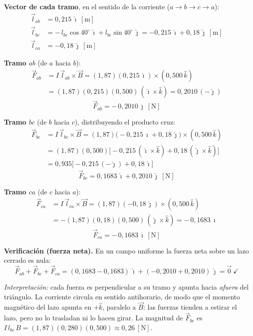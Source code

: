 \documentclass[12pt,letterpaper]{article}
\begin{document}
\bigskip

\noindent\textbf{Vector de cada tramo}, en el sentido de la corriente ($a\to b\to c\to a$):
\begin{align*}
    \vec{l}_{ab} &= 0{,}215\,\hat{\imath}\ [\text{m}]\\[2pt]
    \vec{l}_{bc} &= -\,l_{bc}\cos40^\circ\,\hat{\imath} + l_{bc}\sin40^\circ\,\hat{\jmath}
                  = -0{,}215\,\hat{\imath} + 0{,}18\,\hat{\jmath}\ [\text{m}]\\[2pt]
    \vec{l}_{ca} &= -0{,}18\,\hat{\jmath}\ [\text{m}]
\end{align*}

\noindent\textbf{Tramo $ab$} (de $a$ hacia $b$):
\begin{align*}
    \vec{F}_{ab} &= I\,\vec{l}_{ab}\times\vec{B} = (1{,}87)(0{,}215\,\hat{\imath})\times(0{,}500\,\hat{k})\\[2pt]
                 &= (1{,}87)(0{,}215)(0{,}500)\,(\hat{\imath}\times\hat{k}) = 0{,}2010\,(-\hat{\jmath})
\end{align*}
\[
    \boxed{\vec{F}_{ab} = -\,0{,}2010\,\hat{\jmath}\ [\text{N}]}
\]

\noindent\textbf{Tramo $bc$} (de $b$ hacia $c$), distribuyendo el producto cruz:
\begin{align*}
    \vec{F}_{bc} &= I\,\vec{l}_{bc}\times\vec{B}
                  = (1{,}87)\bigl(-0{,}215\,\hat{\imath} + 0{,}18\,\hat{\jmath}\bigr)\times(0{,}500\,\hat{k})\\[2pt]
                 &= (1{,}87)(0{,}500)\bigl[-0{,}215\,(\hat{\imath}\times\hat{k}) + 0{,}18\,(\hat{\jmath}\times\hat{k})\bigr]\\[2pt]
                 &= 0{,}935\bigl[-0{,}215\,(-\hat{\jmath}) + 0{,}18\,\hat{\imath}\bigr]
\end{align*}
\[
    \boxed{\vec{F}_{bc} = 0{,}1683\,\hat{\imath} + 0{,}2010\,\hat{\jmath}\ [\text{N}]}
\]

\noindent\textbf{Tramo $ca$} (de $c$ hacia $a$):
\begin{align*}
    \vec{F}_{ca} &= I\,\vec{l}_{ca}\times\vec{B} = (1{,}87)(-0{,}18\,\hat{\jmath})\times(0{,}500\,\hat{k})\\[2pt]
                 &= -(1{,}87)(0{,}18)(0{,}500)\,(\hat{\jmath}\times\hat{k}) = -\,0{,}1683\,\hat{\imath}
\end{align*}
\[
    \boxed{\vec{F}_{ca} = -\,0{,}1683\,\hat{\imath}\ [\text{N}]}
\]

\noindent\textbf{Verificaci\'on (fuerza neta).} En un campo uniforme la fuerza neta sobre un lazo
cerrado es nula:
\[
    \vec{F}_{ab} + \vec{F}_{bc} + \vec{F}_{ca}
    = (0{,}1683 - 0{,}1683)\,\hat{\imath} + (-0{,}2010 + 0{,}2010)\,\hat{\jmath} = \vec{0}\ \checkmark
\]

\noindent\small\textit{Interpretaci\'on:} cada fuerza es perpendicular a su tramo y apunta hacia
\emph{afuera} del tri\'angulo. La corriente circula en sentido antihorario, de modo que el momento
magn\'etico del lazo apunta en $+\hat{k}$, paralelo a $\vec{B}$: las fuerzas tienden a estirar el
lazo, pero no lo trasladan ni lo hacen girar. La magnitud de $\vec{F}_{bc}$ es
$I\,l_{bc}\,B = (1{,}87)(0{,}280)(0{,}500) \approx 0{,}26\ [\text{N}]$.
\normalsize
\end{document}
